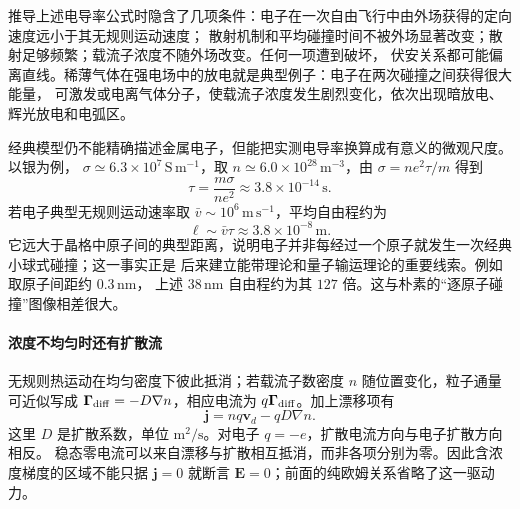 {推导上述电导率公式时隐含了几项条件：电子在一次自由飞行中由外场获得的定向速度远小于其无规则运动速度；
散射机制和平均碰撞时间不被外场显著改变；散射足够频繁；载流子浓度不随外场改变。任何一项遭到破坏，
伏安关系都可能偏离直线。稀薄气体在强电场中的放电就是典型例子：电子在两次碰撞之间获得很大能量，
可激发或电离气体分子，使载流子浓度发生剧烈变化，依次出现暗放电、辉光放电和电弧区。

\par\noindent\begin{minipage}{\linewidth}
\gasDischargeFigure
{}
\end{minipage}\par\medskip

经典模型仍不能精确描述金属电子，但能把实测电导率换算成有意义的微观尺度。以银为例，
$\sigma\simeq6.3\times10^7\,\mathrm{S\,m^{-1}}$，取
$n\simeq6.0\times10^{28}\,\mathrm{m^{-3}}$，由 $\sigma=ne^2\tau/m$ 得到
\begin{equation}
  \boxed{\tau=\frac{m\sigma}{ne^2}\approx3.8\times10^{-14}\,\mathrm s}.
\end{equation}
若电子典型无规则运动速率取 $\bar v\sim10^6\,\mathrm{m\,s^{-1}}$，平均自由程约为
\begin{equation}
  \boxed{\ell\sim\bar v\tau\approx3.8\times10^{-8}\,\mathrm m}.
\end{equation}
它远大于晶格中原子间的典型距离，说明电子并非每经过一个原子就发生一次经典小球式碰撞；这一事实正是
后来建立能带理论和量子输运理论的重要线索。例如取原子间距约 $0.3\,\mathrm{nm}$，
上述 $38\,\mathrm{nm}$ 自由程约为其 $127$ 倍。这与朴素的“逐原子碰撞”图像相差很大。


\paragraph{浓度不均匀时还有扩散流}
无规则热运动在均匀密度下彼此抵消；若载流子数密度 $n$ 随位置变化，粒子通量可近似写成
$\boldsymbol\Gamma_{\rm diff}=-D\nabla n$，相应电流为 $q\boldsymbol\Gamma_{\rm diff}$。加上漂移项有
\[
 \boldsymbol j=nq\boldsymbol v_d-qD\nabla n.
\]
这里 $D$ 是扩散系数，单位 $\mathrm{m^2/s}$。对电子 $q=-e$，扩散电流方向与电子扩散方向相反。
稳态零电流可以来自漂移与扩散相互抵消，而非各项分别为零。因此含浓度梯度的区域不能只据 $\boldsymbol j=0$ 就断言 $\boldsymbol E=0$；前面的纯欧姆关系省略了这一驱动力。


}
